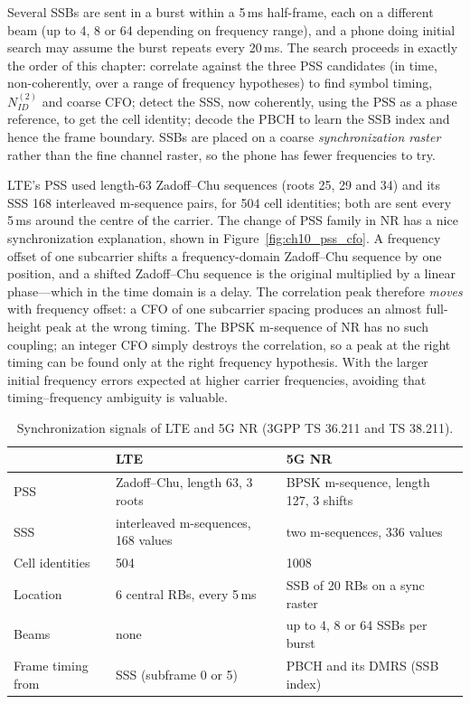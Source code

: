 Several SSBs are sent in a burst within a 5\,ms half-frame, each on a different beam (up to 4, 8 or 64
depending on frequency range), and a phone doing initial search may assume the burst repeats every
20\,ms. The search proceeds in exactly the order of this chapter: correlate against the three PSS
candidates (in time, non-coherently, over a range of frequency hypotheses) to find symbol timing,
$N_{ID}^{(2)}$ and coarse CFO; detect the SSS, now coherently, using the PSS as a phase reference, to get
the cell identity; decode the PBCH to learn the SSB index and hence the frame boundary. SSBs are placed
on a coarse \emph{synchronization raster} rather than the fine channel raster, so the phone has fewer
frequencies to try.

LTE's PSS used length-63 Zadoff--Chu sequences (roots 25, 29 and 34) and its SSS 168 interleaved
m-sequence pairs, for 504 cell identities; both are sent every 5\,ms around the centre of the carrier.
The change of PSS family in NR has a nice synchronization explanation, shown in
Figure~\ref{fig:ch10_pss_cfo}. A frequency offset of one subcarrier shifts a frequency-domain
Zadoff--Chu sequence by one position, and a shifted Zadoff--Chu sequence is the original multiplied by a
linear phase---which in the time domain is a delay. The correlation peak therefore \emph{moves} with
frequency offset: a CFO of one subcarrier spacing produces an almost full-height peak at the wrong
timing. The BPSK m-sequence of NR has no such coupling; an integer CFO simply destroys the correlation,
so a peak at the right timing can be found only at the right frequency hypothesis. With the larger
initial frequency errors expected at higher carrier frequencies, avoiding that timing--frequency
ambiguity is valuable.

\begin{table}[htbp]\centering\small
\caption{Synchronization signals of LTE and 5G NR (3GPP TS 36.211 and TS 38.211).}
\label{tab:ch10:ssb}
\begin{tabular}{lll}
\toprule
 & LTE & 5G NR \\
\midrule
PSS & Zadoff--Chu, length 63, 3 roots & BPSK m-sequence, length 127, 3 shifts \\
SSS & interleaved m-sequences, 168 values & two m-sequences, 336 values \\
Cell identities & 504 & 1008 \\
Location & 6 central RBs, every 5\,ms & SSB of 20 RBs on a sync raster \\
Beams & none & up to 4, 8 or 64 SSBs per burst \\
Frame timing from & SSS (subframe 0 or 5) & PBCH and its DMRS (SSB index) \\
\bottomrule
\end{tabular}
\end{table}

